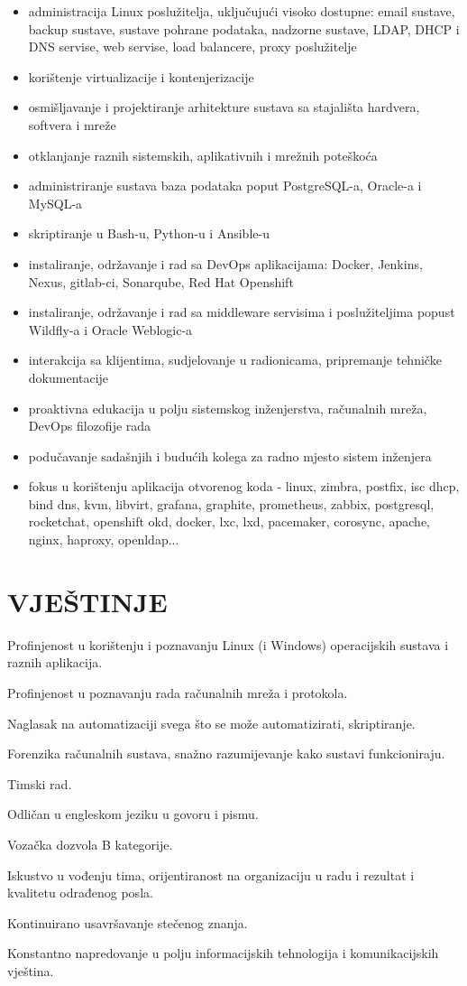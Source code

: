 \documentclass{cv}
\begin{document}
\begin{itemize}
    \setlength\itemsep{0.1cm}
    \item administracija Linux poslužitelja, uključujući visoko dostupne: email sustave, backup sustave, sustave pohrane podataka, nadzorne sustave, LDAP, DHCP i DNS servise, web servise, load balancere, proxy poslužitelje
    \item korištenje virtualizacije i kontenjerizacije
    \item osmišljavanje i projektiranje arhitekture sustava sa stajališta hardvera, softvera i mreže
    \item otklanjanje raznih sistemskih, aplikativnih i mrežnih poteškoća
    \item administriranje sustava baza podataka poput PostgreSQL-a, Oracle-a i MySQL-a
    \item skriptiranje u Bash-u, Python-u i Ansible-u 
    \item instaliranje, održavanje i rad sa DevOps aplikacijama: Docker, Jenkins, Nexus, gitlab-ci, Sonarqube, Red Hat Openshift
    \item instaliranje, održavanje i rad sa middleware servisima i poslužiteljima popust Wildfly-a i Oracle Weblogic-a
    \item interakcija sa klijentima, sudjelovanje u radionicama, pripremanje tehničke dokumentacije
    \item proaktivna edukacija u polju sistemskog inženjerstva, računalnih mreža, DevOps filozofije rada
    \item podučavanje sadašnjih i budućih kolega za radno mjesto sistem inženjera
    \item fokus u korištenju aplikacija otvorenog koda - linux, zimbra, postfix, isc dhcp, bind dns, kvm, libvirt, grafana, graphite, prometheus, zabbix, postgresql, rocketchat, openshift okd, docker, lxc, lxd, pacemaker, corosync, apache, nginx, haproxy, openldap...
\end{itemize}
\section{VJEŠTINJE}
Profinjenost u korištenju i poznavanju Linux (i Windows) operacijskih sustava i raznih aplikacija.

Profinjenost u poznavanju rada računalnih mreža i protokola.

Naglasak na automatizaciji svega što se može automatizirati, skriptiranje.

Forenzika računalnih sustava, snažno razumijevanje kako sustavi funkcioniraju.

Timski rad.

Odličan u engleskom jeziku u govoru i pismu.

Vozačka dozvola B kategorije.

Iskustvo u vođenju tima, orijentiranost na organizaciju u radu i rezultat i kvalitetu odrađenog posla.

Kontinuirano usavršavanje stečenog znanja.

Konstantno napredovanje u polju informacijskih tehnologija i komunikacijskih vještina.
\end{document}

